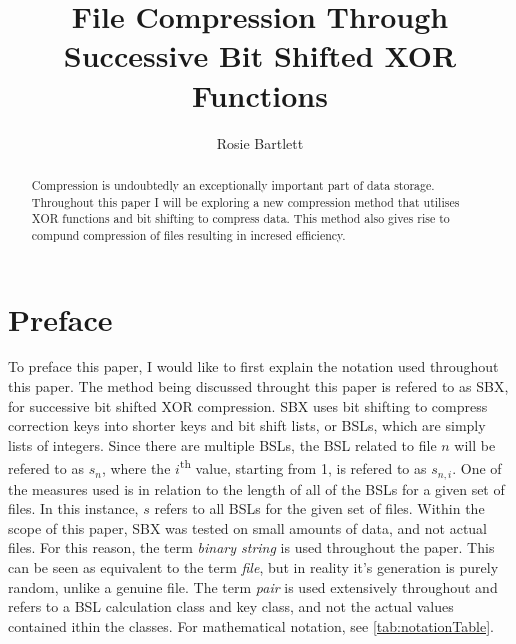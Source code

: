 \documentclass{hehe}
\title{File Compression Through Successive Bit Shifted XOR Functions}
\author{Rosie Bartlett}
\begin{document}
\maketitle

\begin{abstract}
Compression is undoubtedly an exceptionally important part of data storage. Throughout this paper I will be exploring a new compression method that utilises XOR functions and bit shifting to compress data. This method also gives rise to compund compression of files resulting in incresed efficiency.
\end{abstract}

\section{Preface}

To preface this paper, I would like to first explain the notation used throughout this paper. The method being discussed throught this paper is refered to as SBX, for successive bit shifted XOR compression. SBX uses bit shifting to compress correction keys into shorter keys and bit shift lists, or BSLs, which are simply lists of integers. Since there are multiple BSLs, the BSL related to file $n$ will be refered to as $s_n$, where the $i$\textsuperscript{th} value, starting from 1, is refered to as $s_{n,i}$. One of the measures used is in relation to the length of all of the BSLs for a given set of files. In this instance, $s$ refers to all BSLs for the given set of files. Within the scope of this paper, SBX was tested on small amounts of data, and not actual files. For this reason, the term \textit{binary string} is used throughout the paper. This can be seen as equivalent to the term \textit{file}, but in reality it's generation is purely random, unlike a genuine file. The term \textit{pair} is used extensively throughout and refers to a BSL calculation class and key class, and not the actual values contained ithin the classes. For mathematical notation, see \cref{tab:notationTable}.
\end{document}
